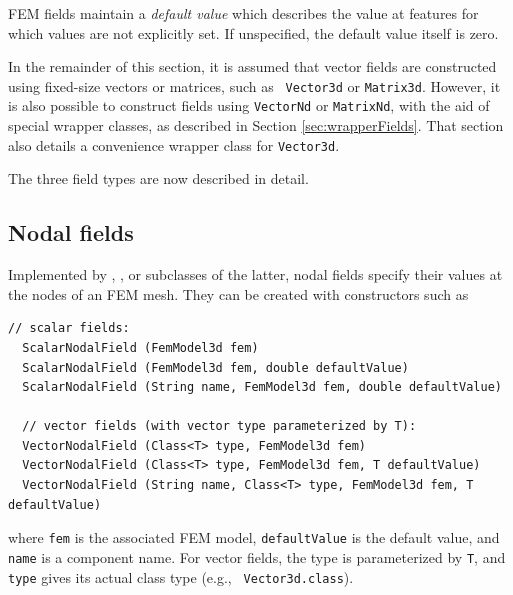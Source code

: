 FEM fields maintain a {\it default value} which describes the value at
features for which values are not explicitly set. If unspecified,
the default value itself is zero.

In the remainder of this section, it is assumed that vector fields are
constructed using fixed-size vectors or matrices, such as {\tt
Vector3d} or {\tt Matrix3d}.  However, it is also possible to
construct fields using {\tt VectorNd} or {\tt MatrixNd}, with the aid
of special wrapper classes, as described in Section
\ref{sec:wrapperFields}. That section also details a convenience
wrapper class for {\tt Vector3d}.

The three field types are now described in detail.

\subsection{Nodal fields}

Implemented by
,
, 
or subclasses
of the latter, nodal fields specify their values at the nodes of an
FEM mesh. They can be created with constructors such as
%
\begin{lstlisting}[]
  // scalar fields:
  ScalarNodalField (FemModel3d fem)
  ScalarNodalField (FemModel3d fem, double defaultValue)
  ScalarNodalField (String name, FemModel3d fem, double defaultValue)

  // vector fields (with vector type parameterized by T):
  VectorNodalField (Class<T> type, FemModel3d fem)
  VectorNodalField (Class<T> type, FemModel3d fem, T defaultValue)
  VectorNodalField (String name, Class<T> type, FemModel3d fem, T defaultValue)
\end{lstlisting}
%
where {\tt fem} is the associated FEM model, {\tt defaultValue} is the
default value, and {\tt name} is a component name. For vector fields,
the  type is parameterized by
{\tt T}, and {\tt type} gives its actual class type (e.g., {\tt
Vector3d.class}).

